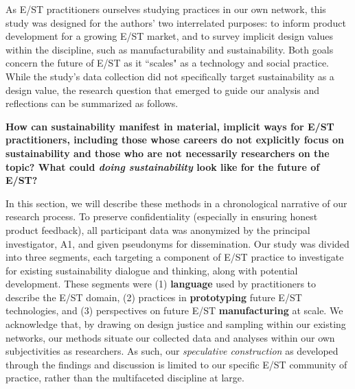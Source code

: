 \documentclass[manuscript,review,anonymous]{acmart}
\begin{document}
As E/ST practitioners ourselves studying practices in our own network, this study was designed for the authors' two interrelated purposes: to inform product development for a growing E/ST market, and to survey implicit design values within the discipline, such as manufacturability and sustainability. Both goals concern the future of E/ST as it ``scales" as a technology and social practice. While the study's data collection did not specifically target sustainability as a design value, the research question that emerged to guide our analysis and reflections can be summarized as follows.

\begin{framed}
\noindent
\textbf{How can sustainability manifest in material, implicit ways for E/ST practitioners, including those whose careers do not explicitly focus on sustainability and those who are not necessarily researchers on the topic? What could \textit{doing sustainability} look like for the future of E/ST?}  
\end{framed}  

In this section, we will describe these methods in a chronological narrative of our research process. To preserve confidentiality (especially in ensuring honest product feedback), all participant data was anonymized by the principal investigator, A1, and given pseudonyms for dissemination.
Our study was divided into three segments, each targeting a component of E/ST practice to investigate for existing sustainability dialogue and thinking, along with potential development. These segments were (1) \textbf{language} used by practitioners to describe the E/ST domain, (2) practices in \textbf{prototyping} future E/ST technologies, and (3) perspectives on future E/ST \textbf{manufacturing} at scale.
We acknowledge that, by drawing on design justice and sampling within our existing networks, our methods situate our collected data and analyses within our own subjectivities as researchers. As such, our \textit{speculative construction} as developed through the findings and discussion is limited to our specific E/ST community of practice, rather than the multifaceted discipline at large.
\end{document}
